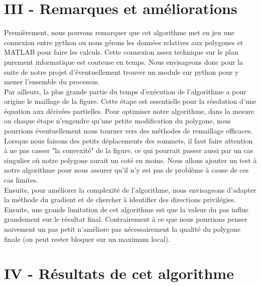 \documentclass[a4paper,reqno]{article}
\begin{document}
\section*{III - Remarques et améliorations}
Premièrement, nous pouvons remarquer que cet algorithme met en jeu une connexion entre python ou nous gérons les données relatives aux polygones et MATLAB pour faire les calculs. Cette connexion assez technique sur le plan purement informatique est couteuse en temps. Nous envisageons donc pour la suite de notre projet d'éventuellement trouver un module sur python pour y mener l'ensemble du processus. \\
 Par ailleurs, la plus grande partie du temps d'exécution de l'algorithme a pour origine le maillage de la figure. Cette étape est essentielle pour la résolution d'une équation aux dérivées partielles. Pour optimiser notre algorithme, dans la mesure ou chaque étape n'engendre qu'une petite modification du polygone, nous pourrions éventuellement nous tourner vers des méthodes de remaillage efficaces. \\
Lorsque nous faisons des petits déplacements des sommets, il faut faire attention à ne pas casser "la convexité" de la figure, ce qui pourrait passer aussi par un cas singulier où notre polygone aurait un coté en moins. Nous allons ajouter un test à notre algorithme pour nous assurer qu'il n'y est pas de problème à cause de ces cas limites. \\
Ensuite, pour améliorer la complexité de l'algorithme, nous envisageons d'adapter la méthode du gradient et de chercher à identifier des directions privilégies.\\
Ensuite, une grande limitation de cet algorithme est que la valeur du pas influe grandement sur le résultat final. Contrairement à ce que nous pourrions penser naivement un pas petit n'améliore pas nécessairement la qualité du polygone finale (on peut rester bloquer sur un maximum local).

\newpage
\section*{IV - Résultats de cet algorithme }
\end{document}
